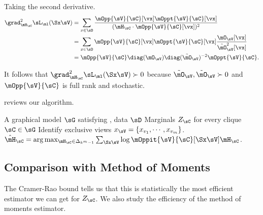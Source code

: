 Taking the second derivative.
\begin{align}
  \grad^2_{\mH_\sC} \sL_\ml(\Sx \sV) 
  &= \sum_{x \in \sD} \frac{\mOpp{\sV}{\sC}[\vx] \mOppt{\sV}{\sC}[\vx]}{(\mH_\sC \cdot \mOpp{\sV}{\sC}[\vx])^2} \nonumber \\
  &= \sum_{x \in \sD}\mOpp{\sV}{\sC}[\vx] \mOppt{\sV}{\sC}[\vx] \frac{\mO_{\sV}[\vx]}{\tilde \mO_{\sV}^2[\vx]} \nonumber \\
  &= \mOpp{\sV}{\sC} \diag(\mO_{\sV}) \diag(\tilde \mO_{\sV})^{-2} \mOppt{\sV}{\sC}. \label{eqn:lhood-hess}%
\end{align}

It follows that $\grad^2_{\mH_\sC} \sL_\ml(\Sx \sV) \succ 0$ because
$\tilde \mO_\sV, \tilde \mO_\sV \succ 0$ and $\mOpp{\sV}{\sC}$ is
full rank and stochastic.

 reviews our algorithm.

\begin{algorithm}
  \caption{\LearnPiecewise}
  \label{algo:piecewise}
  \begin{algorithmic}
    \REQUIRE A graphical model $\sG$ satisfying , data $\sD$
    \ENSURE Marginals $Z_\sC$ for every clique $\sC \in \sG$
\STATE Identify exclusive views $x_\sV = \{x_{v_1}, \cdots, x_{v_m}\}$.
\STATE $\hat \mH_\sC = \arg\max_{\mH_\sC \in \Delta_{k^m-1}} \sum_{\Sx \sV} \log  \mOppit{\sV}{\sC}[\Sx \sV] \mH_\sC$.
  \end{algorithmic}
\end{algorithm}

\subsection{Comparison with Method of Moments}

The Cramer-Rao bound tells us that this is statistically the most
  efficient estimator we can get for $Z_\sC$. 
We also study the efficiency of the method of moments estimator.

